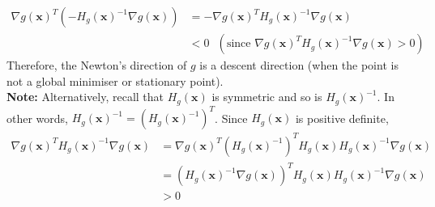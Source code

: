 \documentclass{article}
\begin{document}
\begin{itemize}
   \begin{align*}
       \nabla g(\mathbf{x})^T\left(-H_g(\mathbf{x})^{-1}\nabla g(\mathbf{x})\right) & = -\nabla g(\mathbf{x})^TH_g(\mathbf{x})^{-1}\nabla g(\mathbf{x}) \\
       &<0 \ \ \ (\text{since } \nabla g(\mathbf{x})^TH_g(\mathbf{x})^{-1}\nabla g(\mathbf{x})>0)
   \end{align*}
   Therefore, the Newton's direction of $g$ is a descent direction (when the point is not a global minimiser or stationary point).
   \\
   \textbf{Note:} Alternatively, recall that $H_g(\mathbf{x})$ is symmetric and so is $H_g(\mathbf{x})^{-1}$. In other words, $H_g(\mathbf{x})^{-1}=\left(H_g(\mathbf{x})^{-1}\right)^T$. Since $H_g(\mathbf{x})$ is positive definite, 
   \begin{align*}
       \nabla g(\mathbf{x})^TH_g(\mathbf{x})^{-1}\nabla g(\mathbf{x}) &=\nabla g(\mathbf{x})^T\left(H_g(\mathbf{x})^{-1}\right)^TH_g(\mathbf{x})H_g(\mathbf{x})^{-1}\nabla g(\mathbf{x})\\& =\left(H_g(\mathbf{x})^{-1}\nabla g(\mathbf{x}) \right)^T H_g(\mathbf{x})H_g(\mathbf{x})^{-1}\nabla g(\mathbf{x})  \\&>0
   \end{align*}
\end{itemize}
\end{document}

